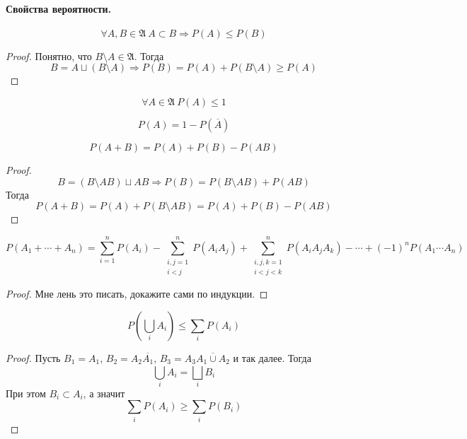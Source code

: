 \documentclass{article}
\newcommand{\A}{{\mathfrak A}}
\begin{document}
    \paragraph{Свойства вероятности.}
    \begin{property}
        $$
        \forall A,B\in\A~A\subset B\Rightarrow P(A)\leqslant P(B)
        $$
    \end{property}
    \begin{proof}
        Понятно, что $B\setminus A\in\A$. Тогда
        $$
        B=A\sqcup(B\setminus A)\Rightarrow P(B)=P(A)+P(B\setminus A)\geqslant P(A)
        $$
    \end{proof}
    \begin{corollary}
        $$\forall A\in\A~P(A)\leqslant1$$
    \end{corollary}
    \begin{property}
        $$
        P(A)=1-P(\overline A)
        $$
    \end{property}
    \begin{property}
        $$
        P(A+B)=P(A)+P(B)-P(AB)
        $$
    \end{property}
    \begin{proof}
        $$
        B=(B\setminus AB)\sqcup AB\Rightarrow P(B)=P(B\setminus AB)+P(AB)
        $$
        Тогда
        $$
        P(A+B)=P(A)+P(B\setminus AB)=P(A)+P(B)-P(AB)
        $$
    \end{proof}
    \begin{claim}
        $$
        P(A_1+\cdots+A_n)=\sum\limits_{i=1}^nP(A_i)-\sum\limits_{\substack{i,j=1\\i<j}}^nP(A_iA_j)+\sum\limits_{\substack{i,j,k=1\\i<j<k}}^nP(A_iA_jA_k)-\cdots+(-1)^nP(A_1\cdots A_n)
        $$
    \end{claim}
    \begin{proof}
        Мне лень это писать, докажите сами по индукции.
    \end{proof}
    \begin{claim}
        $$
        P\left(\bigcup\limits_iA_i\right)\leqslant\sum\limits_i P(A_i)
        $$
    \end{claim}
    \begin{proof}
        Пусть $B_1=A_1$, $B_2=A_2\overline{A_1}$, $B_3=A_3\overline{A_1\cup A_2}$ и так далее. Тогда
        $$
        \bigcup\limits_iA_i=\bigsqcup\limits_iB_i
        $$
        При этом $B_i\subset A_i$, а значит
        $$
        \sum\limits_i P(A_i)\geqslant\sum\limits_i P(B_i)
        $$
    \end{proof}
\end{document}
